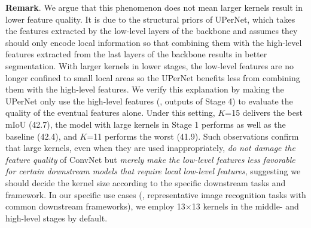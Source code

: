 \documentclass[10pt,twocolumn,letterpaper]{article}
\begin{document}
\noindent\textbf{Remark}. We argue that this phenomenon does not mean larger kernels result in lower feature quality. It is due to the structural priors of UPerNet, which takes the features extracted by the low-level layers of the backbone and assumes they should only encode local information so that combining them with the high-level features extracted from the last layers of the backbone results in better segmentation. With larger kernels in lower stages, the low-level features are no longer confined to small local areas so the UPerNet benefits less from combining them with the high-level features. We verify this explanation by making the UPerNet only use the high-level features (\ie, outputs of Stage 4) to evaluate the quality of the eventual features alone. Under this setting, $K$=15 delivers the best mIoU (42.7), the model with large kernels in Stage 1 performs as well as the baseline (42.4), and $K$=11 performs the worst (41.9). Such observations confirm that large kernels, even when they are used inappropriately, \emph{do not damage the feature quality} of ConvNet but \emph{merely make the low-level features less favorable for certain downstream models that require local low-level features}, suggesting we should decide the kernel size according to the specific downstream tasks and framework. In our specific use cases (\ie, representative image recognition tasks with common downstream frameworks), we employ 13$\times$13 kernels in the middle- and high-level stages by default.
\end{document}

